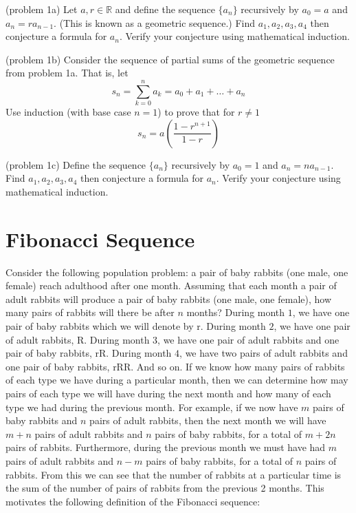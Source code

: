 \documentclass[handout]{ximera}
\begin{document}
\begin{problem}(problem 1a)
Let $a, r \in \mathbb{R}$ and define the sequence $\{a_n\}$ recursively by $a_0 = a$ and $a_n = ra_{n-1} $.  (This is known as a geometric sequence.)
Find $a_1, a_2, a_3, a_4$ then conjecture a formula for $a_n$. Verify your conjecture using mathematical induction.\\
\end{problem}

\begin{problem}(problem 1b)
Consider the sequence of partial sums of the geometric sequence from problem 1a. That is, let
\[
s_n = \sum_{k=0}^n a_k = a_0 + a_1 + \dots + a_n
\]
Use induction (with base case $n=1$) to prove that for $r \neq 1$
\[
s_n = a\left(\frac{1-r^{n+1}}{1-r}\right)
\]
\end{problem}

\begin{problem}(problem 1c)
Define the sequence $\{a_n\}$ recursively by $a_0 = 1$ and $a_n = na_{n-1} $.  
Find $a_1, a_2, a_3, a_4$ then conjecture a formula for $a_n$. Verify your conjecture using mathematical induction.\\
\end{problem}

\section{Fibonacci Sequence}
Consider the following population problem: a pair of baby rabbits (one male, one female) reach adulthood after one month. 
Assuming that each month a pair of adult rabbits will produce a pair of baby rabbits (one male, one female), 
how many pairs of rabbits will there be after $n$ months? During month $1$, we have one pair of baby rabbits which we will denote by r.
During month $2$, we have one pair of adult rabbits, R. During month $3$, we have one pair of adult rabbits and one pair of baby rabbits, rR.
During month $4$, we have two pairs of adult rabbits and one pair of baby rabbits, rRR. And so on. 
If we know how many pairs of rabbits of each type we have during a particular month, 
then we can determine how may pairs of each type we will have during the next month and how many of each type we had during the previous month.
For example, if we now have $m$ pairs of baby rabbits and $n$ pairs of adult rabbits, 
then the next month we will have $m+n$ pairs of adult rabbits and $n$ pairs of baby rabbits, 
for a total of $m+2n$ pairs of rabbits.  
Furthermore, during the previous month we must have had $m$ pairs of adult rabbits and $n-m$ pairs of baby rabbits, 
for a total of $n$ pairs of rabbits.
From this we can see that the number of rabbits at a particular time is the sum of the number of pairs of rabbits from the previous 2 months.
This motivates the following definition of the Fibonacci sequence:
\end{document}
